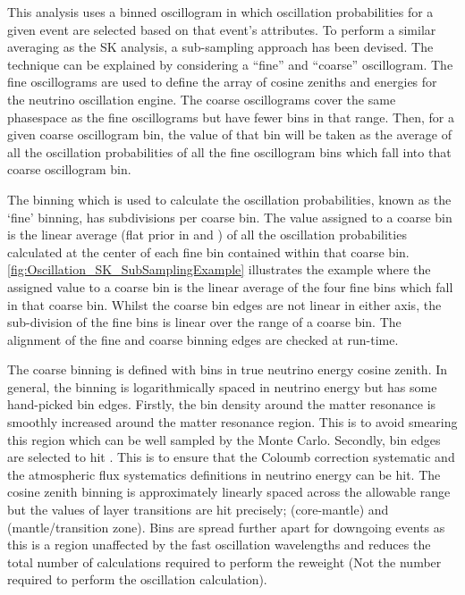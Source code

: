 This analysis uses a binned oscillogram in which oscillation probabilities for a given event are selected based on that event's attributes. To perform a similar averaging as the SK analysis, a sub-sampling approach has been devised. The technique can be explained by considering a ``fine'' and ``coarse'' oscillogram. The fine oscillograms are used to define the array of cosine zeniths and energies for the neutrino oscillation engine. The coarse oscillograms cover the same phasespace as the fine oscillograms but have fewer bins in that range. Then, for a given coarse oscillogram bin, the value of that bin will be taken as the average of all the oscillation probabilities of all the fine oscillogram bins which fall into that coarse oscillogram bin.

The binning which is used to calculate the oscillation probabilities, known as the `fine' binning, has  subdivisions per coarse bin. The value assigned to a coarse bin is the linear average (flat prior in  and ) of all the oscillation probabilities calculated at the center of each fine bin contained within that coarse bin. \autoref{fig:Oscillation_SK_SubSamplingExample} illustrates the  example where the assigned value to a coarse bin is the linear average of the four fine bins which fall in that coarse bin. Whilst the coarse bin edges are not linear in either axis, the sub-division of the fine bins is linear over the range of a coarse bin. The alignment of the fine and coarse binning edges are checked at run-time.

The coarse binning is defined with  bins in true neutrino energy \quickmath{\times} cosine zenith. In general, the binning is logarithmically spaced in neutrino energy but has some hand-picked bin edges. Firstly, the bin density around the matter resonance is smoothly increased around the matter resonance region. This is to avoid smearing this region which can be well sampled by the Monte Carlo. Secondly, bin edges are selected to hit . This is to ensure that the Coloumb correction systematic and the atmospheric flux systematics definitions in neutrino energy can be hit. The cosine zenith binning is approximately linearly spaced across the allowable range but the values of layer transitions are hit precisely;  (core-mantle) and  (mantle/transition zone). Bins are spread further apart for downgoing events as this is a region unaffected by the fast oscillation wavelengths and reduces the total number of calculations required to perform the reweight (Not the number required to perform the oscillation calculation).


